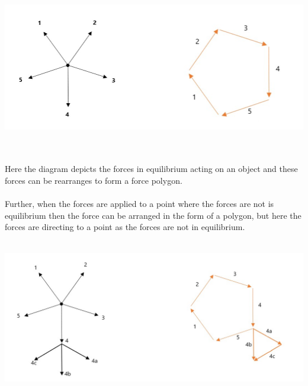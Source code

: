 \documentclass{article}
\begin{document}
    \\\\
    \centerline{\includegraphics[width=7in]{Images/forcegraph.png}}
    \\\\
    Here the diagram depicts the forces in equilibrium acting on an object and these forces can be rearranges to form a force polygon. 
    \\\\
    Further, when the forces are applied to a point where the forces are not is equilibrium then the force can be arranged in the form of a polygon, but here the forces are directing to a point as the forces are not in equilibrium.
    \\\\
    \centerline{\includegraphics[width=7in]{Images/forcegraphext.jpg}}
    \\\\
    
\end{document}
